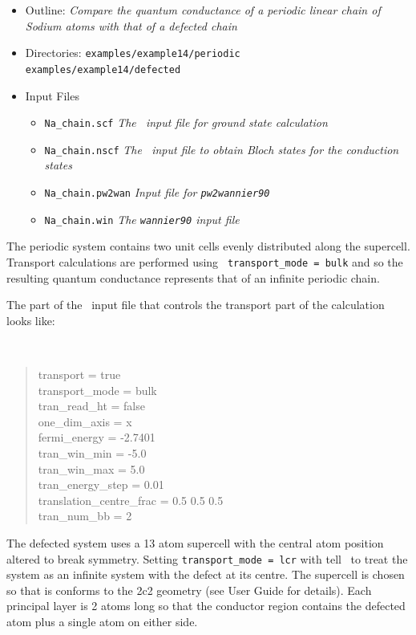 \documentclass[a4paper,11pt,twoside]{article}
\begin{document}
\begin{itemize}
  \item{Outline: \it{Compare the quantum conductance of a periodic 
  	linear chain of Sodium atoms with that of a defected chain}}
  \item{\begin{tabbing}
  Directories: \= {\tt examples/example14/periodic}\\ 
    				 \> {\tt examples/example14/defected}
    		\end{tabbing}}
  \item{Input Files}
    \begin{itemize}
      \item{ {\tt Na\_chain.scf}  {\it The \pwscf\ input file for ground state
	  calculation}}
      \item{ {\tt Na\_chain.nscf}  {\it The \pwscf\ input file to obtain Bloch
	  states for the conduction states}} 
      \item{ {\tt Na\_chain.pw2wan}  {\it Input file for {\tt pw2wannier90}}}
      \item{ {\tt Na\_chain.win}  {\it The {\tt wannier90} input file}}
    \end{itemize}
\end{itemize}

The periodic system contains two unit cells evenly distributed along
the supercell. Transport calculations are performed using {\tt
  transport\_mode = bulk} and so the resulting quantum conductance
represents that of an infinite periodic chain.

The part of the \wannier\ input file that controls the transport part
of the calculation looks like:

{\tt
\begin{quote}
transport = true\\
transport\_mode = bulk\\
tran\_read\_ht = false\\
one\_dim\_axis = x\\
fermi\_energy = -2.7401\\
tran\_win\_min = -5.0\\
tran\_win\_max = 5.0\\
tran\_energy\_step = 0.01\\
translation\_centre\_frac = 0.5 0.5 0.5\\
tran\_num\_bb = 2

\end{quote} }

The defected system uses a 13 atom supercell with the central atom
position altered to break symmetry. Setting {\tt transport\_mode = lcr} with tell 
\wannier\ to treat the system as an infinite system with the defect at its centre.
The supercell is chosen so that is conforms to the 2c2 geometry (see User Guide 
for details). Each principal layer is 2 atoms long so that the conductor 
region contains the defected atom plus a single atom on either side.
\end{document}
